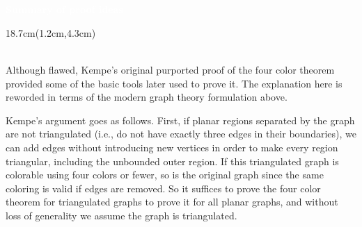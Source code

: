 \documentclass[11pt,a4paper,twoside]{book}
\newenvironment{positionedparagraph}[4]{%
	\begin{textblock*}{#1}(#2,#3)
		\noindent\textbf{#4}\par\medskip
	}{%
	\end{textblock*}
}
\begin{document}
\newpage

\begin{tcolorbox}[colback=blue!48, colframe=blue!48, width=\linewidth, boxrule=0pt, arc=0pt, outer arc=0pt, sharp corners] \textcolor{white}{\textbf{\\ \\  \Huge Summary of proof ideas \\}}
\end{tcolorbox}
\begin{positionedparagraph}{18.7cm}{1.2cm}{4.3cm}
\Huge{} \\[0.2cm]
Although flawed, Kempe's original purported proof of the four color theorem provided some of the basic tools later used to prove it. The explanation here is reworded in terms of the modern graph theory formulation above.

Kempe's argument goes as follows. First, if planar regions separated by the graph are not triangulated (i.e., do not have exactly three edges in their boundaries), we can add edges without introducing new vertices in order to make every region triangular, including the unbounded outer region. If this triangulated graph is colorable using four colors or fewer, so is the original graph since the same coloring is valid if edges are removed. So it suffices to prove the four color theorem for triangulated graphs to prove it for all planar graphs, and without loss of generality we assume the graph is triangulated. 
\end{positionedparagraph}
\end{document}

